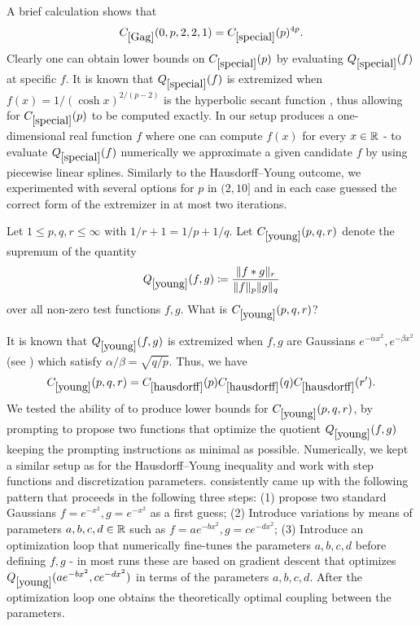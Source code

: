 A brief calculation shows that
$$
C_{\ref{Gag}}(0, p, 2, 2, 1) = C_{\ref{special}}(p)^{4p}.
$$
Clearly one can obtain lower bounds on $C_{\ref{special}}(p)$ by evaluating $Q_{\ref{special}}(f)$ at specific $f$.  It is known that $Q_{\ref{special}}(f)$ is extremized when $f(x) = 1 / (\cosh x)^{2 / (p - 2)}$ is the hyperbolic secant function \cite{Weinstein}, thus allowing for $C_{\ref{special}}(p)$ to be computed exactly.
In our setup \AlphaEvolve produces a one-dimensional real function $f$ where one can compute $f(x)$ for every $x \in \mathbb{R}$ - to evaluate $Q_{\ref{special}}(f)$ numerically we approximate a given candidate $f$ by using piecewise linear splines. Similarly to the Hausdorff--Young outcome, we experimented with several options for $p$ in $(2, 10]$ and in each case \AlphaEvolve guessed the correct form of the extremizer in at most two iterations.

\renewcommand{\problemURL}{https://google-deepmind.github.io/alphaevolve_repository_of_problems/problems/17.html}

\begin{problem}\label{young} Let $1 \leq p,q,r \leq \infty$ with $1/r + 1 = 1/p + 1/q$.  Let $C_{\ref{young}}(p,q,r)$ denote the supremum of the quantity
$$ Q_{\ref{young}}(f, g) \coloneqq \frac{\|f * g\|_r}{\|f\|_p \|g\|_q}$$
over all non-zero test functions $f,g$.  What is $C_{\ref{young}}(p,q,r)$?
\end{problem}

It is known \cite{beckner} that $Q_{\ref{young}}(f,g)$ is extremized when $f, g$ are Gaussians $e^{-\alpha x^2}, e^{-\beta x^2} $ (see \cite{beckner}) which satisfy $\alpha / \beta = \sqrt{q / p}$. Thus, we have
$$ C_{\ref{young}}(p,q,r) = C_{\ref{hausdorff}}(p) C_{\ref{hausdorff}}(q) C_{\ref{hausdorff}}(r').$$
We tested the ability of \AlphaEvolve to produce lower bounds for $C_{\ref{young}}(p,q,r)$, by prompting \AlphaEvolve to propose two functions that optimize the quotient $Q_{\ref{young}}(f, g)$ keeping the prompting instructions as minimal as possible. Numerically, we kept a similar setup as for the Hausdorff--Young inequality and work with step functions and discretization parameters. \AlphaEvolve consistently came up with the following pattern that proceeds in the following three steps: (1) propose two standard Gaussians $f = e^{-x^2}, g = e^{-x^2}$ as a first guess; (2) Introduce variations by means of parameters $a, b, c, d \in \mathbb{R}$ such as $f = a e^{-b x^2}, g = c e^{-d x^2}$; (3) Introduce an optimization loop that numerically fine-tunes the parameters $a, b, c, d$ before defining $f, g$ - in most runs these are based on gradient descent that optimizes $Q_{\ref{young}}(a e^{-b x^2}, c e^{-d x^2})$ in terms of the parameters $a, b, c, d$. After the optimization loop one obtains the theoretically optimal coupling between the parameters.

